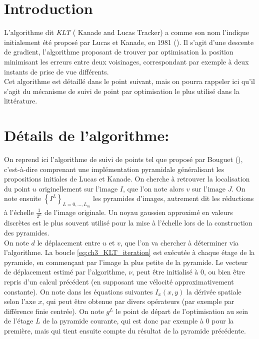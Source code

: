\section{Introduction}
L'algorithme dit \textit{KLT} ( \og Kanade and Lucas Tracker\fg{}) a comme son nom l'indique initialement été proposé par Lucas et Kanade, en 1981 (\cite{Lucas1981a}). Il s'agit d'une descente de gradient, l'algorithme proposant de trouver par optimisation la position minimisant les erreurs entre deux voisinages, correspondant par exemple à deux instants de prise de vue différents. \\
Cet algorithme est détaillé dans le point suivant, mais on pourra rappeler ici qu'il s'agit du mécanisme de suivi de point par optimisation le plus utilisé dans la littérature.

\section{Détails de l'algorithme:\\}\label{sec:ch3_KLT}
On reprend ici l'algorithme de suivi de points tel que proposé par Bouguet (\cite{Bouguet2001a}), c'est-à-dire comprenant une implémentation pyramidale généralisant les propositions initiales de Lucas et Kanade. On cherche à retrouver la localisation du point $u$ originellement sur l'image $I$, que l'on note alors $v$ sur l'image $J$. On note ensuite $\left\lbrace I^L \right\rbrace_{L = 0, ..., L_m}$ les pyramides d'images, autrement dit les réductions à l'échelle $\frac{1}{2^L}$ de l'image originale. Un noyau gaussien approximé en valeurs discrètes est le plus souvent utilisé pour la mise à l'échelle lors de la construction des pyramides.\\

On note $d$ le déplacement entre $u$ et $v$, que l'on va chercher à déterminer via l'algorithme. La boucle \ref{eq:ch3_KLT_iteration} est exécutée à chaque étage de la pyramide, en
commençant par l'image la plus petite de la pyramide. Le vecteur de déplacement estimé par l'algorithme, $\nu$, peut être initialisé à 0, ou bien être repris d'un calcul précédent (en supposant une vélocité approximativement constante). On note dans les équations suivantes $I_x(x,y)$ la dérivée spatiale selon l'axe $x$, qui peut être obtenue par divers opérateurs (par exemple par différence finie centrée). On note $g^L$ le point de départ de l'optimisation au sein de l'étage $L$ de la pyramide courante, qui est donc par exemple à 0 pour la première, mais qui tient ensuite compte du résultat de la pyramide précédente. \\

